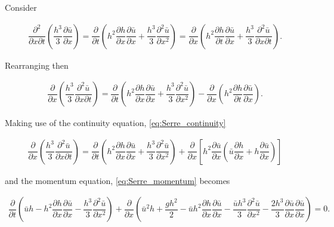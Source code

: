 \documentclass[SingleSpace,12pt]{Serre_ASCE}
\begin{document}
Consider
\begin{linenomath*}
\begin{gather*}
\dfrac{\partial^2}{\partial x \partial t} \left ( \dfrac{h^3}{3} \dfrac{\partial \bar{u}}{\partial x} \right ) = \dfrac{\partial }{\partial t} \left ( h^2 \dfrac{\partial h}{\partial x} \dfrac{\partial \bar{u}}{\partial x} + \dfrac{h^3}{3} \dfrac{\partial^2 \bar{u}}{\partial x^2} \right ) =
\dfrac{\partial }{\partial x} \left ( h^2 \dfrac{\partial h}{\partial t} \dfrac{\partial \bar{u}}{\partial x} + \dfrac{h^3}{3} \dfrac{\partial^2 \bar{u}}{\partial x \partial t} \right ).
\end{gather*}
\end{linenomath*}
Rearranging then
\begin{linenomath*}
\begin{gather*}
\dfrac{\partial }{\partial x} \left ( \dfrac{h^3}{3} \dfrac{\partial^2 \bar{u}}{\partial x \partial t} \right ) = \dfrac{\partial }{\partial t} \left ( h^2 \dfrac{\partial h}{\partial x} \dfrac{\partial \bar{u}}{\partial x} + \dfrac{h^3}{3} \dfrac{\partial^2 \bar{u}}{\partial x^2} \right ) - \dfrac{\partial }{\partial x} \left ( h^2 \dfrac{\partial h}{\partial t} \dfrac{\partial \bar{u}}{\partial x}\right ).
\end{gather*}
\end{linenomath*}
Making use of the continuity equation, \eqref{eq:Serre_continuity}
\begin{linenomath*}
\begin{gather*}
\dfrac{\partial }{\partial x} \left ( \dfrac{h^3}{3} \dfrac{\partial^2 \bar{u}}{\partial x \partial t} \right ) = \dfrac{\partial }{\partial t} \left ( h^2 \dfrac{\partial h}{\partial x} \dfrac{\partial \bar{u}}{\partial x} + \dfrac{h^3}{3} \dfrac{\partial^2 \bar{u}}{\partial x^2} \right ) + \dfrac{\partial }{\partial x} \left [ h^2 \dfrac{\partial \bar{u}}{\partial x} \left ( \bar{u}\dfrac{\partial h}{\partial x} + h \dfrac{\partial \bar{u}}{\partial x}  \right ) \right ]
\end{gather*}
\end{linenomath*}
and the momentum equation, \eqref{eq:Serre_momentum} becomes
\begin{linenomath*}
\begin{gather*}
\dfrac{\partial }{\partial t} \left ( \bar{u}h -  h^2 \dfrac{\partial h}{\partial x} \dfrac{\partial \bar{u}}{\partial x} - \dfrac{h^3}{3} \dfrac{\partial^2 \bar{u}}{\partial x^2}  \right ) + \dfrac{\partial}{\partial x} \left ( \bar{u}^2h + \dfrac{gh^2}{2} - \bar{u}h^2 \dfrac{\partial h}{\partial x}\dfrac{\partial \bar{u}}{\partial x} - \dfrac{\bar{u}h^3}{3} \dfrac{\partial^2 \bar{u}}{\partial x^2} - \dfrac{2h^3}{3}\dfrac{\partial \bar{u}}{\partial x}\dfrac{\partial \bar{u}}{\partial x} \right ) \nonumber  = 0.
\end{gather*}
\end{linenomath*}
\end{document}
